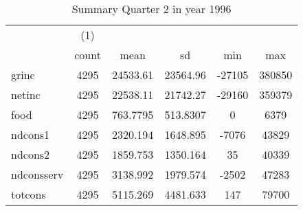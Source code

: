 \begin{table}[htbp]\centering
\def\sym#1{\ifmmode^{#1}\else\(^{#1}\)\fi}
\caption{Summary Quarter 2 in year 1996 \label{sum\_Q2\_y1996}}
\begin{tabular}{l*{1}{ccccc}}
\hline\hline
            &\multicolumn{1}{c}{(1)}&            &            &            &            \\
            &       count&        mean&          sd&         min&         max\\
\hline
grinc       &        4295&    24533.61&    23564.96&      -27105&      380850\\
netinc      &        4295&    22538.11&    21742.27&      -29160&      359379\\
food        &        4295&    763.7795&    513.8307&           0&        6379\\
ndcons1     &        4295&    2320.194&    1648.895&       -7076&       43829\\
ndcons2     &        4295&    1859.753&    1350.164&          35&       40339\\
ndconsserv  &        4295&    3138.992&    1979.574&       -2502&       47283\\
totcons     &        4295&    5115.269&    4481.633&         147&       79700\\
\hline\hline
\end{tabular}
\end{table}
